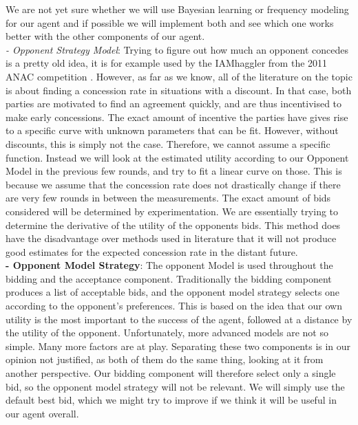 \documentclass{article}
\begin{document}
\begin{enumerate}[label=(\alph*)]
\quad We are not yet sure whether we will use Bayesian learning or frequency modeling for our agent and if possible we will implement both and see which one works better with the other components of our agent.\\ 

\emph{- Opponent Strategy Model}: Trying to figure out how much an opponent concedes is a pretty old idea, it is for example used by the IAMhaggler from the 2011 ANAC competition \cite{Williams2012}. However, as far as we know, all of the literature on the topic is about finding a concession rate in situations with a discount. In that case, both parties are motivated to find an agreement quickly, and are thus incentivised to make early concessions. The exact amount of incentive the parties have gives rise to a specific curve with unknown parameters that can be fit. However, without discounts, this is simply not the case. Therefore, we cannot assume a specific function. Instead we will look at the estimated utility according to our Opponent Model in the previous few rounds, and try to fit a linear curve on those. This is because we assume that the concession rate does not drastically change if there are very few rounds in between the measurements. The exact amount of bids considered will be determined by experimentation. We are essentially trying to determine the derivative of the utility of the opponents bids. This method does have the disadvantage over methods used in literature that it will not produce good estimates for the expected concession rate in the distant future. \\

\textbf{- Opponent Model Strategy}: The opponent Model is used throughout the bidding and the acceptance component. Traditionally the bidding component produces a list of acceptable bids, and the opponent model strategy selects one according to the opponent's preferences. This is based on the idea that our own utility is the most important to the success of the agent, followed at a distance by the utility of the opponent. Unfortunately, more advanced models are not so simple. Many more factors are at play. Separating these two components is in our opinion not justified, as both of them do the same thing, looking at it from another perspective. Our bidding component will therefore select only a single bid, so the opponent model strategy will not be relevant. We will simply use the default best bid, which we might try to improve if we think it will be useful in our agent overall.\\


\end{enumerate}
\end{document}
